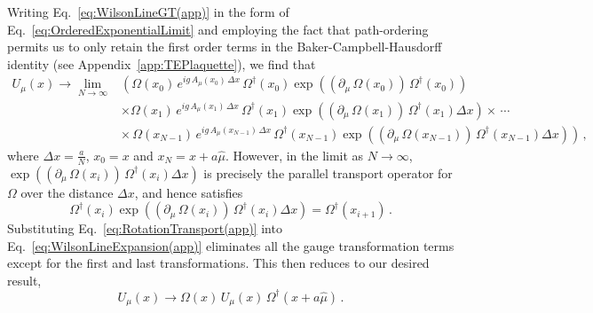 Writing Eq.~\ref{eq:WilsonLineGT(app)} in the form of Eq.~\ref{eq:OrderedExponentialLimit} and employing the fact that path-ordering permits us to only retain the first order terms in the Baker-Campbell-Hausdorff identity (see Appendix~\ref{app:TEPlaquette}), we find that
%
\begin{align}
U_\mu(x)\rightarrow \lim_{N\rightarrow\infty} &\left( \Omega(x_0)\,e^{ig\,A_\mu(x_0)\,\Delta x}\,\Omega^\dagger(x_0) \exp\left((\partial_\mu\,\Omega(x_0))\,\Omega^\dagger(x_0)\right)\right.\nonumber\\
&\times \Omega(x_1)\,e^{ig\,A_\mu(x_1)\,\Delta x}\,\Omega^\dagger(x_1) \exp\left((\partial_\mu\,\Omega(x_1))\,\Omega^\dagger(x_1)\Delta x\right) \times \, \cdots \nonumber\\
&\left. \times \, \Omega(x_{N-1})\,e^{ig\,A_\mu(x_{N-1})\,\Delta x}\,\Omega^\dagger(x_{N-1}) \exp\left((\partial_\mu\,\Omega(x_{N-1}))\,\Omega^\dagger(x_{N-1})\Delta x\right) \right)\, , \label{eq:WilsonLineExpansion(app)}
\end{align}
%
where $\Delta x = \frac{a}{N}$, $x_0=x$ and $x_N = x+a\hat{\mu}$. However, in the limit as $N\rightarrow\infty$, $\exp\left((\partial_\mu\,\Omega(x_i))\,\Omega^\dagger(x_i)\Delta x \right)$ is precisely the parallel transport operator for $\Omega$ over the distance $\Delta x$, and hence satisfies 
%
\begin{equation}
\Omega^\dagger(x_i)\exp\left((\partial_\mu\,\Omega(x_i))\,\Omega^\dagger(x_i)\Delta x \right) = \Omega^\dagger(x_{i+1})\, .
\label{eq:RotationTransport(app)}
\end{equation}
%
Substituting Eq.~\ref{eq:RotationTransport(app)} into Eq.~\ref{eq:WilsonLineExpansion(app)} eliminates all the gauge transformation terms except for the first and last transformations. This then reduces to our desired result,
%
\begin{equation}
U_\mu(x)\rightarrow \Omega(x)\,U_\mu(x)\,\Omega^\dagger(x+a\hat{\mu})\, .
\end{equation} 
